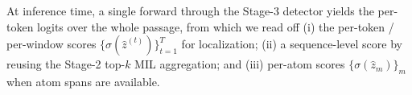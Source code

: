 At inference time, a single forward through the Stage-3 detector
yields the per-token logits over the whole passage, from which we
read off (i) the per-token / per-window scores
$\{\sigma(\hat{z}^{(t)})\}_{t=1}^{T}$ for localization; (ii) a
sequence-level score by reusing the Stage-2 top-$k$ MIL aggregation;
and (iii) per-atom scores $\{\sigma(\hat{z}_m)\}_m$ when atom spans
are available.
